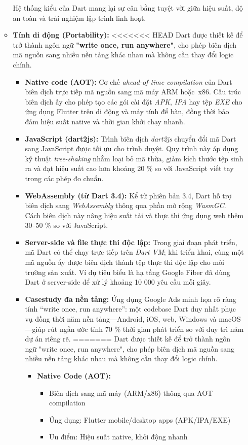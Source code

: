 \documentclass[../DoAn.tex]{subfiles}
\numberwithin{figure}{chapter}
\begin{document}
\begin{itemize}
\begin{itemize}
Hệ thống kiểu của Dart mang lại sự cân bằng tuyệt vời giữa hiệu suất, độ an toàn và trải nghiệm lập trình linh hoạt.

    \item \textbf{Tính di động (Portability):} 
<<<<<<< HEAD
Dart được thiết kế để trở thành ngôn ngữ \textbf{"write once, run anywhere"}, cho phép biên dịch mã nguồn sang nhiều nền tảng khác nhau mà không cần thay đổi logic chính.
\begin{itemize}
\item \textbf{Native code (AOT):} Cơ chế \textit{ahead-of-time compilation} của Dart biên dịch trực tiếp mã nguồn sang mã máy ARM hoặc~x86. Cấu trúc biên dịch ấy cho phép tạo các gói cài đặt \textit{APK}, \textit{IPA} hay tệp \textit{EXE} cho ứng dụng Flutter trên di động và máy tính để bàn, đồng thời bảo đảm hiệu suất native và thời gian khởi chạy nhanh.

\item \textbf{JavaScript (dart2js):} Trình biên dịch \textit{dart2js} chuyển đổi mã Dart sang JavaScript được tối ưu cho trình duyệt. Quy trình này áp dụng kỹ thuật \textit{tree-shaking} nhằm loại bỏ mã thừa, giảm kích thước tệp sinh ra và đạt hiệu suất cao hơn khoảng 20 \% so với JavaScript viết tay trong các phép đo chuẩn.

\item \textbf{WebAssembly (từ Dart 3.4):} Kể từ phiên bản 3.4, Dart hỗ trợ biên dịch sang \textit{WebAssembly} thông qua phần mở rộng \textit{WasmGC}. Cách biên dịch này nâng hiệu suất tải và thực thi ứng dụng web thêm 30–50 \% so với JavaScript.

\item \textbf{Server-side và file thực thi độc lập:} Trong giai đoạn phát triển, mã Dart có thể chạy trực tiếp trên \textit{Dart VM}; khi triển khai, cùng một mã nguồn ấy được biên dịch thành tệp thực thi độc lập cho môi trường sản xuất. Ví dụ tiêu biểu là hạ tầng Google Fiber đã dùng Dart ở server-side để xử lý khoảng 10 000 yêu cầu mỗi giây.

\item \textbf{Casestudy đa nền tảng:} Ứng dụng Google Ads minh họa rõ ràng tính “write once, run anywhere”: một codebase Dart duy nhất phục vụ đồng thời năm nền tảng—Android, iOS, web, Windows và macOS—giúp rút ngắn ước tính 70 \% thời gian phát triển so với duy trì năm dự án riêng rẽ.
=======
Dart được thiết kế để trở thành ngôn ngữ "write once, run anywhere", cho phép biên dịch mã nguồn sang nhiều nền tảng khác nhau mà không cần thay đổi logic chính.
\begin{itemize}
    \item \textbf{Native Code (AOT):} 
    \begin{itemize}
        \item Biên dịch sang mã máy (ARM/x86) thông qua AOT compilation
        \item Ứng dụng: Flutter mobile/desktop apps (APK/IPA/EXE)
        \item Ưu điểm: Hiệu suất native, khởi động nhanh
    \end{itemize}
    

\end{itemize}
\end{itemize}
\end{itemize}
\end{itemize}
\end{document}
